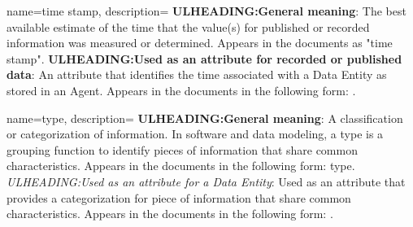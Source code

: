 {
    name={time stamp},
	description={
	\textbf{ULHEADING:General meaning}:
	The best available estimate of the time that the value(s) for published or recorded information was measured or determined.
	Appears in the documents as "time stamp".
	\textbf{ULHEADING:Used as an attribute for recorded or published data}:
	An attribute that identifies the time associated with a \gls{Data Entity} as stored in an \gls{Agent}.
	Appears in the documents in the following form: .
}
}

{
    name={type},
	description={
	\textbf{ULHEADING:General meaning}:
	A classification or categorization of information.
	In software and data modeling, a type is a grouping function to identify pieces of information that share common characteristics. 
	Appears in the documents in the following form: type.
	\textit{ULHEADING:Used as an attribute for a \gls{Data Entity}}:
	Used as an attribute that provides a categorization for piece of information that share common characteristics.
	Appears in the documents in the following form: .
}
}
